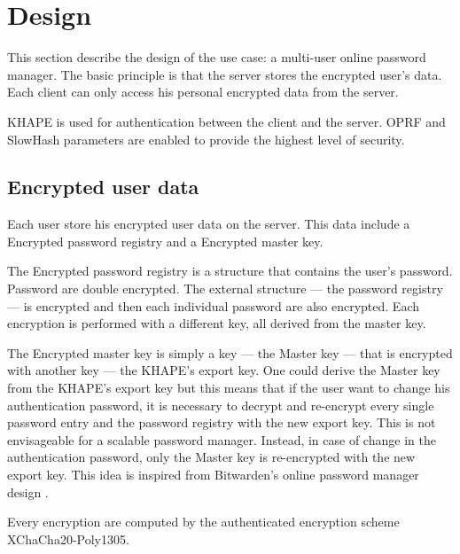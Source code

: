 \documentclass[../report.tex]{subfiles}
\begin{document}
\section{Design}

This section describe the design of the use case: a multi-user online password manager.
The basic principle is that the server stores the encrypted user's data. 
Each client can only access his personal encrypted data from the server.

KHAPE is used for authentication between the client and the server. OPRF and SlowHash parameters are enabled to provide the highest level of security.







\subsection{Encrypted user data}
Each user store his encrypted user data on the server. This data include a Encrypted password registry and a Encrypted master key.


The Encrypted password registry is a structure that contains the user's password. Password are double encrypted. The external structure --- the password registry --- is encrypted and then each individual password are also encrypted. Each encryption is performed with a different key, all derived from the master key.

The Encrypted master key is simply a key --- the Master key --- that is encrypted with another key --- the KHAPE's export key. 
One could derive the Master key from the KHAPE's export key but this means that if the user want to change his authentication password, it is necessary to decrypt and re-encrypt every single password entry and the password registry with the new export key. This is not envisageable for a scalable password manager. Instead, in case of change in the authentication password, only the Master key is re-encrypted with the new export key. This idea is inspired from Bitwarden's online password manager design \cite{bitwarden}.

Every encryption are computed by the authenticated encryption scheme XChaCha20-Poly1305.



% 
% 
% 
% 
\end{document}
